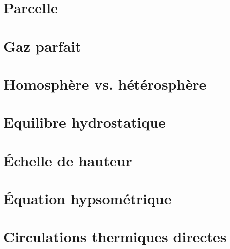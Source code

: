 \documentclass[a4paper,DIV16,10pt]{scrartcl}
\begin{document}
 \inidoc


\newpage \section{Parcelle}    %

\newpage \section{Gaz parfait} 

\newpage \section{Homosphère vs. hétérosphère} 


\newpage \section{Equilibre hydrostatique} 

\newpage \section{\'Echelle de hauteur} 

\section{\'Equation hypsométrique} 


\newpage \section{Circulations thermiques directes} 

\end{document}
